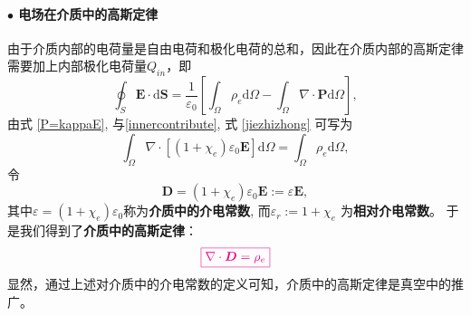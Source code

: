 \documentclass[10pt,reqno, final]{ctexart}
\begin{document}
\paragraph{$\bullet$ 电场在介质中的高斯定律} 由于介质内部的电荷量是自由电荷和极化电荷的总和，因此在介质内部的高斯定律需要加上内部极化电荷量$Q_{in}$，即
\begin{equation}\label{jiezhizhong}
\oint_S \bm{E}\cdot \mathrm{d}\bm{S} = \frac{1}{\varepsilon_0}\left[ \int_\Omega \rho_e \mathrm{d}\Omega-\int_\Omega \nabla\cdot\bm{P} \mathrm{d}\Omega \right],
\end{equation} 
由式 	\eqref{P=kappaE}, 与\eqref{innercontribute}, 式	\eqref{jiezhizhong} 可写为
\begin{equation}
\int_{\Omega} \nabla\cdot[(1+\chi_e)\varepsilon_0\bm{E}]\mathrm{d}\Omega = \int_\Omega \rho_e \mathrm{d}\Omega,
\end{equation}
令 
$$\bm{D} = (1+\chi_e)\varepsilon_0\bm{E}:= \varepsilon \bm{E},$$
其中$\varepsilon=(1+\chi_e)\varepsilon_0$称为\textbf{介质中的介电常数}, 而$\varepsilon_r:=1+\chi_e$ 为\textbf{相对介电常数}。
于是我们得到了\textbf{介质中的高斯定律}：
\begin{equation}\label{gaussThmgeneral}
\color{magenta}{\boxed{\nabla\cdot \bm{D} = \rho_e }} 
\end{equation}
显然，通过上述对介质中的介电常数的定义可知，介质中的高斯定律是真空中的推广。





\end{document}
